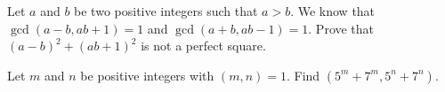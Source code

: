 \begin{problem}
	Let $a$ and $b$ be two positive integers such that $a>b$. We know that $\gcd(a-b,ab+1)=1$ and $\gcd(a+b,ab-1)=1$. Prove that $(a-b)^2+(ab+1)^2$ is not a perfect square. %
\end{problem}

%
%
%
%
%
%
%
%
%
%
%
%
%

\begin{problem}
	Let $m$ and $n$ be positive integers with $(m,n)=1$. Find $(5^m+7^m,5^n+7^n)$. %
\end{problem}

